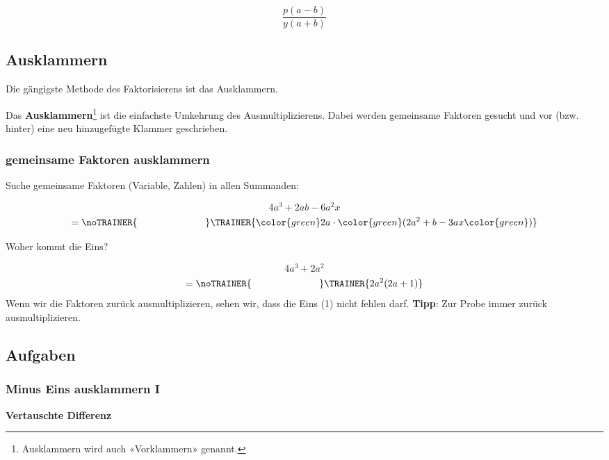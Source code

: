 $$\frac{p(a-b)}{y(a+b)}$$

\newpage

\subsection{Ausklammern}
Die gängigste Methode des Faktorisierens ist das Ausklammern.

Das \textbf{Ausklammern}\footnote{Ausklammern wird auch «Vorklammern» genannt.} ist die einfachste Umkehrung des Ausmultiplizierens.
Dabei werden gemeinsame Faktoren gesucht und vor (bzw. hinter) eine
neu hinzugefügte Klammer geschrieben.

\subsubsection{gemeinsame Faktoren ausklammern}
Suche gemeinsame Faktoren (Variable, Zahlen) in allen Summanden:

\begin{beispiel}{}{}
  $$4a^3 + 2ab -6a^2x$$
  $$=\noTRAINER{\hspace{7em}}\TRAINER{ {\color{green}2a}\cdot{\color{green}(}2a^2+b -3ax{\color{green})}}$$
\end{beispiel}

\begin{beispiel}{Woher kommt die Eins?}{}

$$4a^3 + 2a^2$$
$$=\noTRAINER{\hspace{7em}}\TRAINER{2a^2(2a + 1)}$$
Wenn wir die Faktoren zurück ausmultiplizieren, sehen wir, dass die
Eins (1) nicht fehlen darf. \textbf{Tipp}: Zur Probe immer zurück ausmultiplizieren.
\end{beispiel}

\subsection*{Aufgaben}
\newpage


\subsubsection{Minus Eins ausklammern I}

\textbf{Vertauschte Differenz}\\

